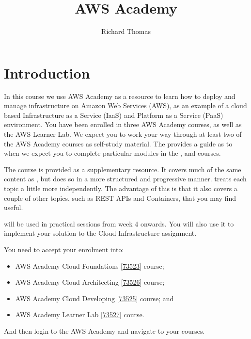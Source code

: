 \title{AWS Academy}
\author{Richard Thomas}
\date{}

\maketitle

\section{Introduction}
In this course we use AWS Academy as a resource to learn how to deploy and manage infrastructure on Amazon Web Services (AWS),
as an example of a cloud based Infrastructure as a Service (IaaS) and Platform as a Service (PaaS) environment.
You have been enrolled in three AWS Academy courses, as well as the AWS Learner Lab.
We expect you to work your way through at least two of the AWS Academy courses as self-study material.
The  provides a guide as to when we expect you to complete particular modules in the
,
and  courses.

The  course is provided as a supplementary resource.
It covers much of the same content as , 
but  does so in a more structured and progressive manner.
 treats each topic a little more independently.
The advantage of this is that it also covers a couple of other topics, such as REST APIs and Containers, that you may find useful.

 will be used in practical sessions from week 4 onwards.
You will also use it to implement your solution to the Cloud Infrastructure assignment.

You need to accept your enrolment into:
\begin{itemize}
    \item AWS Academy Cloud Foundations [\href{https://awsacademy.instructure.com/courses/73523}{73523}] course;
    \item AWS Academy Cloud Architecting [\href{https://awsacademy.instructure.com/courses/73526}{73526}] course;
    \item AWS Academy Cloud Developing [\href{https://awsacademy.instructure.com/courses/73525}{73525}] course; and
    \item AWS Academy Learner Lab [\href{https://awsacademy.instructure.com/courses/73527}{73527}] course.
\end{itemize}
And then login to the AWS Academy and navigate to your courses.

